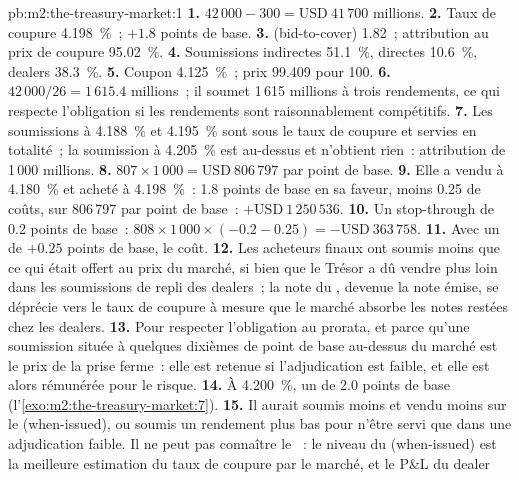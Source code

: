 \begin{solution}{pb:m2:the-treasury-market:1}
\textbf{1.} $42\,000 - 300 = \text{USD}~41\,700$ millions.
\textbf{2.} Taux de coupure 4.198~\%~;  $+1.8$ points de base.
\textbf{3.}  (bid-to-cover) 1.82~; attribution au prix de coupure 95.02~\%.
\textbf{4.} Soumissions indirectes 51.1~\%, directes 10.6~\%, dealers 38.3~\%.
\textbf{5.} Coupon 4.125~\%~; prix 99.409 pour 100.
\textbf{6.} $42\,000/26 = 1\,615.4$ millions~; il soumet 1\,615 millions à trois
rendements, ce qui respecte l'obligation si les rendements sont raisonnablement compétitifs.
\textbf{7.} Les soumissions à 4.188~\% et 4.195~\% sont sous le taux de coupure et servies
en totalité~; la soumission à 4.205~\% est au-dessus et n'obtient rien~: attribution de 1\,000
millions.
\textbf{8.} $807 \times 1\,000 = \text{USD}~806\,797$ par point de base.
\textbf{9.} Elle a vendu à 4.180~\% et acheté à 4.198~\%~: 1.8 points de base en sa
faveur, moins 0.25 de coûts, sur 806\,797 par point de base~: $+\text{USD}~1\,250\,536$.
\textbf{10.} Un stop-through de 0.2 points de base~: $808 \times 1\,000 \times (-0.2
- 0.25) = -\text{USD}~363\,758$.
\textbf{11.} Avec un  de $+0.25$ points de base, le coût.
\textbf{12.} Les acheteurs finaux ont soumis moins que ce qui était offert au prix du marché,
si bien que le Trésor a dû vendre plus loin dans les soumissions de repli des dealers~;
la note du , devenue la note émise, se déprécie vers le taux de coupure à mesure que le
marché absorbe les notes restées chez les dealers.
\textbf{13.} Pour respecter l'obligation au prorata, et parce qu'une soumission située à quelques dixièmes de
point de base au-dessus du marché est le prix de la prise ferme~: elle est retenue si
l'adjudication est faible, et elle est alors rémunérée pour le risque.
\textbf{14.} À 4.200~\%, un  de 2.0 points de base (l'\cref{exo:m2:the-treasury-market:7}).
\textbf{15.} Il aurait soumis moins et vendu moins sur le  (when-issued), ou soumis un rendement plus bas
pour n'être servi que dans une adjudication faible. Il ne peut pas connaître le ~: le
niveau du  (when-issued) est la meilleure estimation du taux de coupure par le marché, et le P\&L du dealer

\end{solution}
